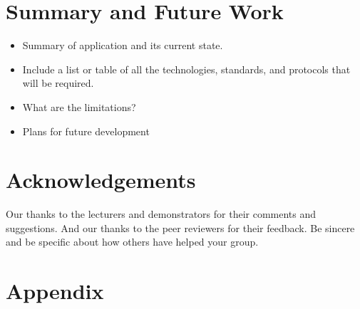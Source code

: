 \documentclass{sig-alt-release2}
\begin{document}



\section{Summary and Future Work}
\begin{itemize}
\item	Summary of application and its current state.
\item	Include a list or table of all the technologies, standards, and protocols that will be required.
\item	What are the limitations?
\item Plans for future development
\end{itemize}

\section{Acknowledgements}
Our thanks to the lecturers and demonstrators for their comments and suggestions. And our thanks to the peer reviewers for their feedback.
Be sincere and be specific about how others have helped your group.




\section{Appendix}

\end{document}

